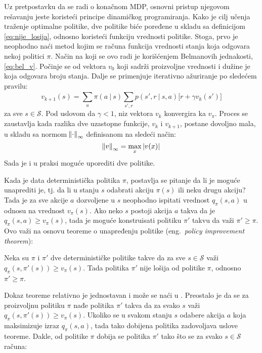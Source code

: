 Uz pretpostavku da se radi o konačnom MDP, osnovni pristup njegovom rešavanju jeste koristeći principe dinamičkog programiranja. Kako je cilj učenja traženje optimalne politike, dve politike biće poređene u skladu sa definicijom \eqref{eq:nije_losija}, odnosno koristeći funkciju vrednosti politike. Stoga, prvo je neophodno naći metod kojim se računa funkcija vrednosti stanja koja odgovara nekoj politici $\pi$.  Način na koji se ovo radi je korišćenjem Belmanovih jednakosti, \eqref{eq:bel_v}. Počinje se od vektora $v_0$ koji sadrži proizvoljne vrednosti i dužine je koja odgovara broju stanja. Dalje se primenjuje iterativno ažuriranje po sledećem pravilu:
\begin{equation}
		v_{k+1}(s) = \sum_{a}^{} \pi(a~|~s)\sum_{s', r}^{}p(s', r~|~s, a) \big[ r+\gamma v_k(s') \big]
\end{equation}
za sve $s \in \mathcal{S}$. Pod uslovom da $\gamma < 1$, niz vektora $v_k$ konvergira ka $v_{\pi}$. Proces se zaustavlja kada razlika dve uzastopne funkcije, $v_k$ i $v_{k+1}$, postane dovoljno mala, u skladu sa normom $\norm{\cdot}_{\infty}$ definisanom na sledeći način:
\begin{equation}
	\label{eq:norm_conv}
	\norm{v}_{\infty} = \max_x|v(x)|
\end{equation}
Sada je i u praksi moguće uporediti dve politike.
\par 
Kada je data deterministička politika $\pi$, postavlja se pitanje da li je moguće unaprediti je, tj. da li u stanju $s$ odabrati akciju $\pi(s)$ ili neku drugu akciju? Tada je za sve akcije $a$ dozvoljene u $s$ neophodno ispitati vrednost $q_{\pi}(s,a)$ u odnosu na vrednost $v_{\pi}(s)$. Ako neko $s$ postoji akcija $a$ takva da je $q_{\pi}(s, a) \geq v_{\pi}(s)$, tada je moguće konstruisati politiku $\pi'$ takvu da važi $\pi' \geq \pi$. Ovo važi na osnovu teoreme o unapređenju politike (eng.~{\em policy improvement theorem}):
\begin{theorem*}
	Neka su $\pi$ i $\pi'$ dve determinističke politike takve da za sve $s \in \mathcal{S}$ važi $q_{\pi}(s, \pi'(s)) \geq v_{\pi}(s)$. Tada politika $\pi'$ nije lošija od politike $\pi$, odnosno $\pi' \geq \pi$.
\end{theorem*}
Dokaz teoreme relativno je jednostavan i može se naći u \cite{rli_tup}. Preostalo je da se za proizvoljnu politiku $\pi$ nađe politika $\pi'$ takva da za svako $s$ važi $q_{\pi}(s, \pi'(s)) \geq v_{\pi}(s)$. Ukoliko se u svakom stanju $s$ odabere akcija $a$ koja maksimizuje izraz $q_{\pi}(s, a)$, tada tako dobijena politika zadovoljava uslove teoreme. Dakle, od politike $\pi$ dobija se politika $\pi'$ tako što se za svako $s \in \mathcal{S}$ računa:
